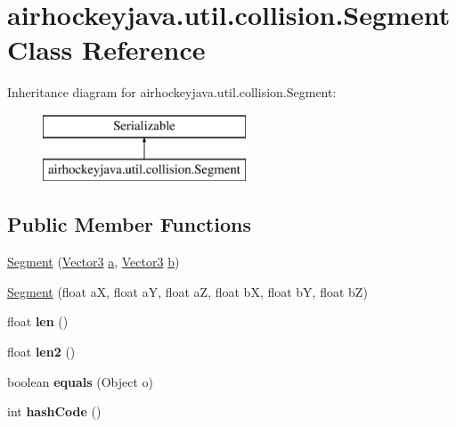 \hypertarget{classairhockeyjava_1_1util_1_1collision_1_1_segment}{}\section{airhockeyjava.\+util.\+collision.\+Segment Class Reference}
\label{classairhockeyjava_1_1util_1_1collision_1_1_segment}
Inheritance diagram for airhockeyjava.\+util.\+collision.\+Segment\+:\begin{figure}[H]
\begin{center}
\leavevmode
\includegraphics[height=2.000000cm]{classairhockeyjava_1_1util_1_1collision_1_1_segment}
\end{center}
\end{figure}
\subsection*{Public Member Functions}
\begin{DoxyCompactItemize}
\item 
\hyperlink{classairhockeyjava_1_1util_1_1collision_1_1_segment_a40e184df090332a10a4bf834e2e45568}{Segment} (\hyperlink{classairhockeyjava_1_1util_1_1_vector3}{Vector3} \hyperlink{classairhockeyjava_1_1util_1_1collision_1_1_segment_a3e5f76be3d478317b7fa3945b2c49538}{a}, \hyperlink{classairhockeyjava_1_1util_1_1_vector3}{Vector3} \hyperlink{classairhockeyjava_1_1util_1_1collision_1_1_segment_a7fb75d6e83dfcdaeb47cba048255addc}{b})
\item 
\hyperlink{classairhockeyjava_1_1util_1_1collision_1_1_segment_a6923bb1a082864328b021aaad6181063}{Segment} (float a\+X, float a\+Y, float a\+Z, float b\+X, float b\+Y, float b\+Z)
\item 
\hypertarget{classairhockeyjava_1_1util_1_1collision_1_1_segment_a113fdbcd6983ea4ba22317423c96dde9}{}float {\bfseries len} ()\label{classairhockeyjava_1_1util_1_1collision_1_1_segment_a113fdbcd6983ea4ba22317423c96dde9}

\item 
\hypertarget{classairhockeyjava_1_1util_1_1collision_1_1_segment_a26cb839fa4489829bfb5122542eaf497}{}float {\bfseries len2} ()\label{classairhockeyjava_1_1util_1_1collision_1_1_segment_a26cb839fa4489829bfb5122542eaf497}

\item 
\hypertarget{classairhockeyjava_1_1util_1_1collision_1_1_segment_a2fa4cb66fec4915d0bfc363e18147dc0}{}boolean {\bfseries equals} (Object o)\label{classairhockeyjava_1_1util_1_1collision_1_1_segment_a2fa4cb66fec4915d0bfc363e18147dc0}

\item 
\hypertarget{classairhockeyjava_1_1util_1_1collision_1_1_segment_ad641b7cd2c408a908a9ffec13e50916b}{}int {\bfseries hash\+Code} ()\label{classairhockeyjava_1_1util_1_1collision_1_1_segment_ad641b7cd2c408a908a9ffec13e50916b}

\end{DoxyCompactItemize}
